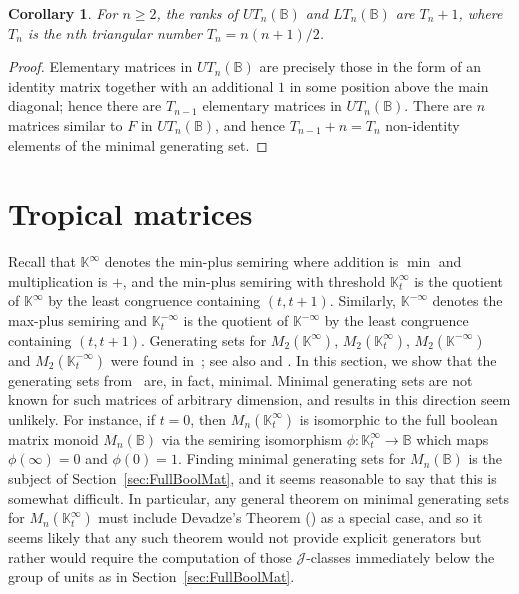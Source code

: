 \documentclass[11pt]{article}
\newtheorem{cor}[thm]{Corollary}
\numberwithin{equation}{section}
\renewcommand{\to}{\longrightarrow}
\newcommand{\B}{\mathbb{B}}
\newcommand{\Bn}{M_n(\B)}
\newcommand{\UTn}{UT_n(\B)}
\newcommand{\LTn}{LT_n(\B)}
\newcommand{\J}{\mathscr{J}}
\newcommand{\K}{\mathbb{K}}
\newcommand{\Kmin}{\K^{\infty}}
\newcommand{\Kmint}{\K^{\infty}_t}
\newcommand{\Kmax}{\K^{-\infty}}
\newcommand{\Kmaxt}{\K^{-\infty}_t}
\begin{document}
\begin{cor}
  For $n \geq 2$, the ranks of $\UTn$ and $\LTn$ are $T_n + 1$, where $T_n$ is
  the $n$th triangular number $T_n = n(n+1)/2$.
\end{cor}
\begin{proof}
  Elementary matrices in $\UTn$ are precisely those in the form of an identity
  matrix together with an additional $1$ in some position above the main
  diagonal; hence there are $T_{n - 1}$ elementary matrices in $\UTn$. There are
  $n$ matrices similar to $F$ in $\UTn$, and hence $T_{n - 1} + n =  T_n$
  non-identity elements of the minimal generating set.
\end{proof}


\section{Tropical matrices}
\label{sec:Tropical}
Recall that $\Kmin$ denotes the min-plus semiring where addition is $\min$ and
multiplication is $+$, and the min-plus semiring with threshold $\Kmint$ is the
quotient of $\Kmin$ by the least congruence containing $(t, t+ 1)$. Similarly,
$\Kmax$ denotes the max-plus semiring and $\Kmaxt$ is the quotient of $\Kmax$ by
the least congruence containing $(t, t + 1)$. Generating
sets for $M_2(\Kmin)$, $M_2(\Kmint)$, $M_2(\Kmax)$ and $M_2(\Kmaxt)$ were found
in~\cite{East2020aa}; see also  and
. In this section, we show that the generating
sets from~\cite{East2020aa} are, in fact, minimal. Minimal generating sets are
not known for such matrices of arbitrary dimension, and results in this
direction seem unlikely. For instance, if $t = 0$, then $M_n(\Kmint)$ is
isomorphic to the full boolean matrix monoid $\Bn$ via the semiring isomorphism
$\phi: \Kmint \to \B$ which maps $\phi(\infty) = 0$ and $\phi(0) = 1$. Finding
minimal generating sets for $\Bn$ is the subject of
Section~\ref{sec:FullBoolMat}, and it seems reasonable to say that this is
somewhat difficult. In particular, any general theorem on minimal generating
sets for $M_n(\Kmint)$ must include Devadze's Theorem ()
as a special case, and so it seems likely that any such theorem would not
provide explicit generators but rather would require the computation of those
$\J$-classes immediately below the group of units as in
Section~\ref{sec:FullBoolMat}.
\end{document}
